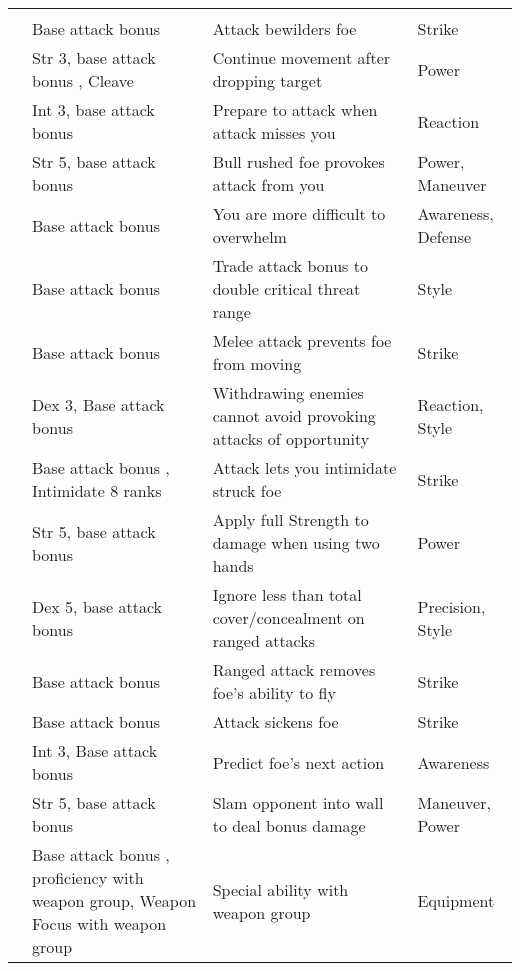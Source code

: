 {\begin{longtabu}{>{\lcol}p{15em} >{\lcol}p{15em} >{\lcol}X >{\lcol}p{10em}}
\midrule
{} &  &  &  \\
 & Base attack bonus  & Attack bewilders foe & Strike \\
 & Str 3, base attack bonus , Cleave & Continue movement after dropping target & Power \\
 & Int 3, base attack bonus  & Prepare to attack when attack misses you & Reaction \\
 & Str 5, base attack bonus  & Bull rushed foe provokes attack from you & Power, Maneuver \\
 & Base attack bonus  & You are more difficult to overwhelm & Awareness, Defense \\
 & Base attack bonus  & Trade attack bonus to double critical threat range & Style \\
 & Base attack bonus  & Melee attack prevents foe from moving & Strike \\
 & Dex 3, Base attack bonus  & Withdrawing enemies cannot avoid provoking attacks of opportunity & Reaction, Style \\
 & Base attack bonus , Intimidate 8 ranks & Attack lets you intimidate struck foe & Strike \\
 & Str 5, base attack bonus  & Apply full Strength to damage when using two hands & Power \\
 & Dex 5, base attack bonus  & Ignore less than total cover/concealment on ranged attacks & Precision, Style \\
 & Base attack bonus  & Ranged attack removes foe's ability to fly & Strike \\ 
 & Base attack bonus  & Attack sickens foe & Strike \\
 & Int 3, Base attack bonus  & Predict foe's next action & Awareness \\
 & Str 5, base attack bonus  & Slam opponent into wall to deal bonus damage & Maneuver, Power \\
 & Base attack bonus , proficiency with weapon group, Weapon Focus with weapon group & Special ability with weapon group & Equipment \\


\end{longtabu}}

